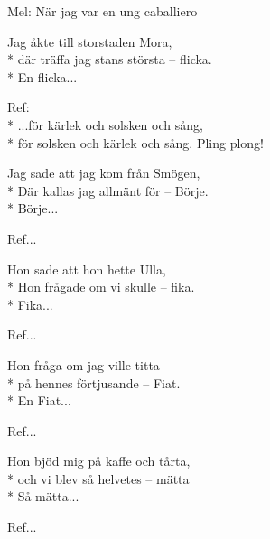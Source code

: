 \begin{SongText}
    \begin{SongInfo}
        Mel: När jag var en ung caballiero
    \end{SongInfo}
    \begin{SongVerse}
        Jag åkte till storstaden Mora,\\*%
        där träffa jag stans största – flicka.\\*%
        En flicka...
    \end{SongVerse}
    \begin{SongVerse}
        Ref:\\*%
        ...för kärlek och solsken och sång,\\*%
        för solsken och kärlek och sång. Pling plong!
    \end{SongVerse}
    \begin{SongVerse}
        Jag sade att jag kom från Smögen,\\*%
        Där kallas jag allmänt för – Börje.\\*%
        Börje...
    \end{SongVerse}
    \begin{SongVerse}
        Ref...
    \end{SongVerse}
    \begin{SongVerse}
        Hon sade att hon hette Ulla,\\*%
        Hon frågade om vi skulle – fika.\\*%
        Fika...
    \end{SongVerse}
    \begin{SongVerse}
        Ref...
    \end{SongVerse}
    \begin{SongVerse}
        Hon fråga om jag ville titta\\*%
        på hennes förtjusande – Fiat.\\*%
        En Fiat...
    \end{SongVerse}
    \begin{SongVerse}
        Ref...
    \end{SongVerse}
    \begin{SongVerse}
        Hon bjöd mig på kaffe och tårta,\\*%
        och vi blev så helvetes – mätta\\*%
        Så mätta...
    \end{SongVerse}
    \begin{SongVerse}
        Ref...
    \end{SongVerse}

\end{SongText}

